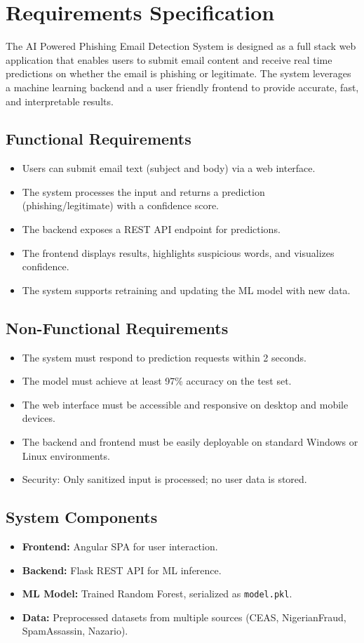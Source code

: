 \documentclass{article}
\begin{document}
\section{Requirements Specification}

The AI Powered Phishing Email Detection System is designed as a full stack web application that enables users to submit email content and receive real time predictions on whether the email is phishing or legitimate. The system leverages a machine learning backend and a user friendly frontend to provide accurate, fast, and interpretable results.

\subsection{Functional Requirements}
\begin{itemize}
    \item Users can submit email text (subject and body) via a web interface.
    \item The system processes the input and returns a prediction (phishing/legitimate) with a confidence score.
    \item The backend exposes a REST API endpoint for predictions.
    \item The frontend displays results, highlights suspicious words, and visualizes confidence.
    \item The system supports retraining and updating the ML model with new data.
\end{itemize}

\subsection{Non-Functional Requirements}
\begin{itemize}
    \item The system must respond to prediction requests within 2 seconds.
    \item The model must achieve at least 97\% accuracy on the test set.
    \item The web interface must be accessible and responsive on desktop and mobile devices.
    \item The backend and frontend must be easily deployable on standard Windows or Linux environments.
    \item Security: Only sanitized input is processed; no user data is stored.
\end{itemize}

\subsection{System Components}
\begin{itemize}
    \item \textbf{Frontend:} Angular SPA for user interaction.
    \item \textbf{Backend:} Flask REST API for ML inference.
    \item \textbf{ML Model:} Trained Random Forest, serialized as \texttt{model.pkl}.
    \item \textbf{Data:} Preprocessed datasets from multiple sources (CEAS, NigerianFraud, SpamAssassin, Nazario).
\end{itemize}
\newpage
\end{document}
